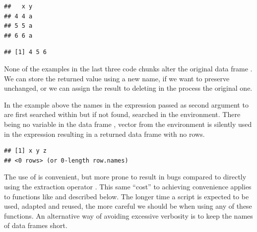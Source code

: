 \documentclass[krantz2]{krantz}\usepackage{knitr}%
\begin{document}
\begin{knitrout}\footnotesize
{}\color{fgcolor}\begin{kframe}
\begin{alltt}
 \hlopt{>} \hlstd{)[ ,} \hlopt{-}\hlstd{]}
\end{alltt}
\begin{verbatim}
##   x y
## 4 4 a
## 5 5 a
## 6 6 a
\end{verbatim}
\begin{alltt}
 \hlopt{>} \hlstd{)}\hlopt{$}
\end{alltt}
\begin{verbatim}
## [1] 4 5 6
\end{verbatim}
\end{kframe}
\end{knitrout}

None of the examples in the last three code chunks alter the original data frame . We can store the returned value using a new name, if we want to preserve  unchanged, or we can assign the result to  deleting in the process the original one.
\begin{warningbox}
  In the example above the names in the expression passed as second argument to  are first searched within  but if not found, searched in the environment. There being no variable  in the data frame , vector  from the environment is silently used in the expression resulting in a returned data frame with no rows.

\begin{knitrout}\footnotesize
{}\color{fgcolor}\begin{kframe}
\begin{alltt}
 \hlkwb{<-} 
 \hlopt{>} \hlstd{)}
\end{alltt}
\begin{verbatim}
## [1] x y z
## <0 rows> (or 0-length row.names)
\end{verbatim}
\end{kframe}
\end{knitrout}

The use of  is convenient, but more prone to result in bugs compared to directly using the extraction operator \code{[]}. This same ``cost'' to achieving convenience applies to functions like  and  described below. The longer time a script is expected to be used, adapted and reused, the more careful we should be when using any of these functions. An alternative way of avoiding excessive verbosity is to keep the names of data frames short.
\end{warningbox}
\end{document}
